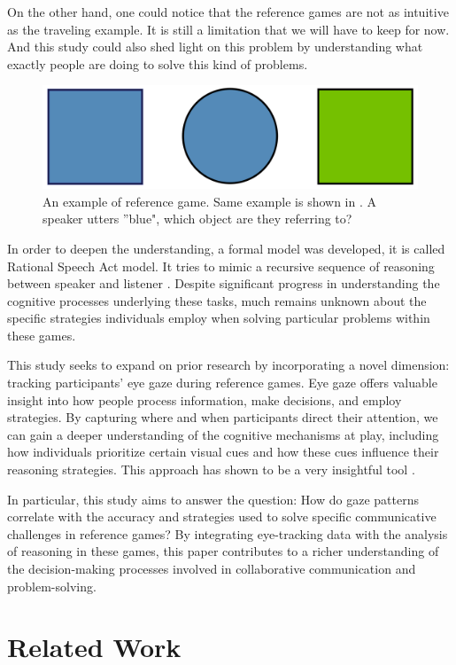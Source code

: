 \documentclass[11pt,a4paper]{article}
\begin{document}
 On the other hand, one could notice that the reference games are not as intuitive as the traveling example. It is still a limitation that we will have to keep for now. And this study could also shed light on this problem by understanding what exactly people are doing to solve this kind of problems.
 
 
\begin{figure}
    \centering
    \includegraphics[width=0.6\linewidth]{images/intro_complex.png}
    \caption{An example of reference game. Same example is shown in \cite{Frank_2012}. A speaker utters ''blue", which object are they referring to?}
    \label{fig:intro_complex}
\end{figure}
In order to deepen the understanding, a formal model was developed, it is called Rational Speech Act model. It tries to mimic a recursive sequence of reasoning between speaker and listener \citep{Franke_2016}. Despite significant progress in understanding the cognitive processes underlying these tasks, much remains unknown about the specific strategies individuals employ when solving particular problems within these games.

This study seeks to expand on prior research by incorporating a novel dimension: tracking participants' eye gaze during reference games. Eye gaze offers valuable insight into how people process information, make decisions, and employ strategies. By capturing where and when participants direct their attention, we can gain a deeper understanding of the cognitive mechanisms at play, including how individuals prioritize certain visual cues and how these cues influence their reasoning strategies. This approach has shown to be a very insightful tool \citep{Vigneau_2006}.

In particular, this study aims to answer the question: How do gaze patterns correlate with the accuracy and strategies used to solve specific communicative challenges in reference games? By integrating eye-tracking data with the analysis of reasoning in these games, this paper contributes to a richer understanding of the decision-making processes involved in collaborative communication and problem-solving.

\section{Related Work}
\end{document}
